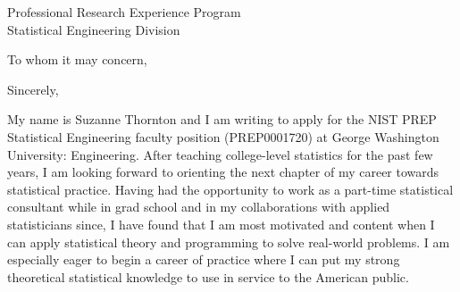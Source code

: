 \documentclass[11pt,a4paper,sans]{moderncv}
\begin{document}
	
	{Professional Research Experience Program\\
	Statistical Engineering Division}
	\date{\today }
	\opening{To whom it may concern,}
	\closing{Sincerely,}
	\makelettertitle
	

	
	
	My name is Suzanne Thornton and I am writing to apply for the NIST PREP Statistical Engineering faculty position (PREP0001720) at George Washington University: Engineering. After teaching college-level statistics for the past few years, I am looking forward to orienting the next chapter of my career towards statistical practice. Having had the opportunity to work as a part-time statistical consultant while in grad school and in my collaborations with applied statisticians since, I have found that I am most motivated and content when I can apply statistical theory and programming to solve real-world problems. I am especially eager to begin a career of practice where I can put my strong theoretical statistical knowledge to use in service to the American public.\\ \vspace{2mm}
\end{document}
